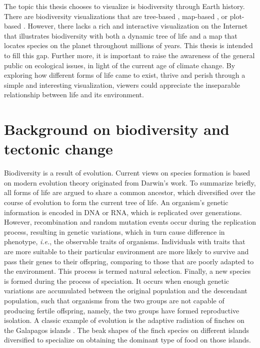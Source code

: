 \documentclass[11pt, a4paper,oneside,chapterprefix=false]{scrbook}
\begin{document}
The topic this thesis chooses to visualize is biodiversity through Earth history. There are biodiversity visualizations that are tree-based \cite{block2012deeptree}, map-based \cite{janicki2016visualizing}, or plot-based \cite{liang2019bioactivity}. However, there lacks a rich and interactive visualization on the Internet that illustrates biodiversity with both a dynamic tree of life and a map that locates species on the planet throughout millions of years. This thesis is intended to fill this gap. Further more, it is important to raise the awareness of the general public on ecological issues, in light of the current age of climate change. By exploring how different forms of life came to exist, thrive and perish through a simple and interesting visualization, viewers could appreciate the inseparable relationship between life and its environment.

\section{Background on biodiversity and tectonic change} \label{sec: two}
Biodiversity is a result of evolution. Current views on species formation is based on modern evolution theory \cite{bowler1989evolution} originated from Darwin's work. To summarize briefly, all forms of life are argued to share a common ancestor, which diversified over the course of evolution to form the current tree of life. An organism's genetic information is encoded in DNA or RNA, which is replicated over generations. However, recombination and random mutation events occur during the replication process, resulting in genetic variations, which in turn cause difference in phenotype, \emph{i.e.}, the observable traits of organisms. Individuals with traits that are more suitable to their particular environment are more likely to survive and pass their genes to their offspring, comparing to those that are poorly adapted to the environment. This process is termed natural selection. Finally, a new species is formed during the process of speciation. It occurs when enough genetic variations are accumulated between the original population and the descendant population, such that organisms from the two groups are not capable of producing fertile offspring, namely, the two groups have formed reproductive isolation. A classic example of evolution is the adaptive radiation of finches on the Galapagos islands \cite{lack1983darwin}. The beak shapes of the finch species on different islands diversified to specialize on obtaining the dominant type of food on those islands.  \\
\end{document}
